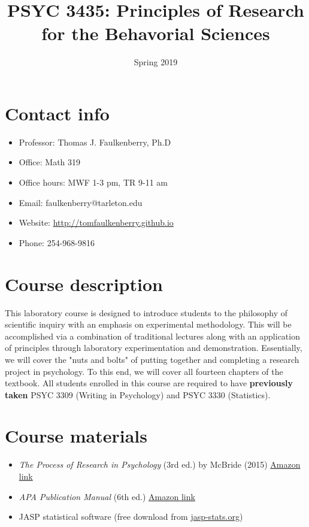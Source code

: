 \documentclass[10pt]{article}
\date{Spring 2019}
\title{PSYC 3435: Principles of Research for the Behavorial Sciences}
\begin{document}
\maketitle

\section*{Contact info}
\label{sec:org8edf7a5}
\begin{itemize}
\item Professor: Thomas J. Faulkenberry, Ph.D
\item Office: Math 319
\item Office hours: MWF 1-3 pm, TR 9-11 am
\item Email: faulkenberry@tarleton.edu
\item Website: \url{http://tomfaulkenberry.github.io}
\item Phone: 254-968-9816
\end{itemize}

\section*{Course description}
\label{sec:orgd14dac2}

This laboratory course is designed to introduce students to the philosophy of scientific inquiry with an emphasis on experimental methodology. This will be accomplished via a combination of traditional lectures along with an application of principles through laboratory experimentation and demonstration. Essentially, we will cover the "nuts and bolts" of putting together and completing a research project in psychology. To this end, we will cover all fourteen chapters of the textbook. All students enrolled in this course are required to have \textbf{previously taken} PSYC 3309 (Writing in Psychology) and PSYC 3330 (Statistics). 

\section*{Course materials}
\label{sec:org23da988}

\begin{itemize}
\item \emph{The Process of Research in Psychology} (3rd ed.) by McBride (2015) \href{https://www.amazon.com/Process-Research-Psychology-Dawn-McBride/dp/1483347605/}{Amazon link}
\item \emph{APA Publication Manual} (6th ed.) \href{http://www.amazon.com/Publication-Manual-American-Psychological-Association/dp/1433805618/}{Amazon link}
\item JASP statistical software (free download from \href{http://jasp-stats.org}{jasp-stats.org})
\end{itemize}
\end{document}
